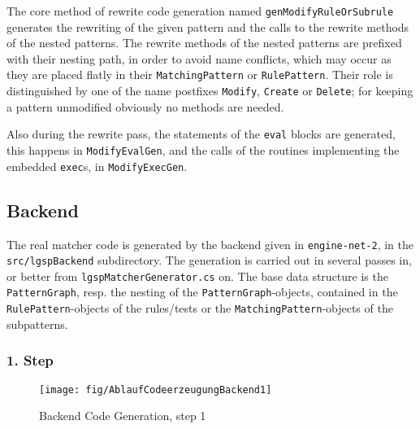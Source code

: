 The core method of rewrite code generation named \texttt{gen\-Modify\-Rule\-Or\-Subrule} generates the rewriting of the given pattern and the calls to the rewrite methods of the nested patterns.
The rewrite methods of the nested patterns are prefixed with their nesting path, in order to avoid name conflicts, which may occur as they are placed flatly in their \texttt{Matching\-Pattern} or \texttt{Rule\-Pattern}.
Their role is distinguished by one of the name postfixes \texttt{Modify}, \texttt{Create} or \texttt{Delete}; for keeping a pattern unmodified obviously no methods are needed.

Also during the rewrite pass, the statements of the \texttt{eval} blocks are generated, this happens in \texttt{Modify\-Eval\-Gen}, and the calls of the routines implementing the embedded \texttt{exec}s, in \texttt{Modify\-Exec\-Gen}.

\pagebreak

\subsection{Backend}

The real matcher code is generated by the backend given in \texttt{engine-net-2}, in the \texttt{src/lgsp\-Backend} subdirectory.
The generation is carried out in several passes in, or better from \texttt{lgsp\-Matcher\-Generator.cs} on.
The base data structure is the \texttt{PatternGraph}, resp. the nesting of the \texttt{PatternGraph}-objects, contained in the \texttt{RulePattern}-objects of the rules/tests or the \texttt{Matching\-Pattern}-objects of the subpatterns.

\subsubsection*{1. Step}

\begin{figure}[htbp]
  \centering
  \texttt{[image: fig/AblaufCodeerzeugungBackend1]}
  \caption{Backend Code Generation, step 1}
  \label{figbackendcodegen1}
\end{figure}

